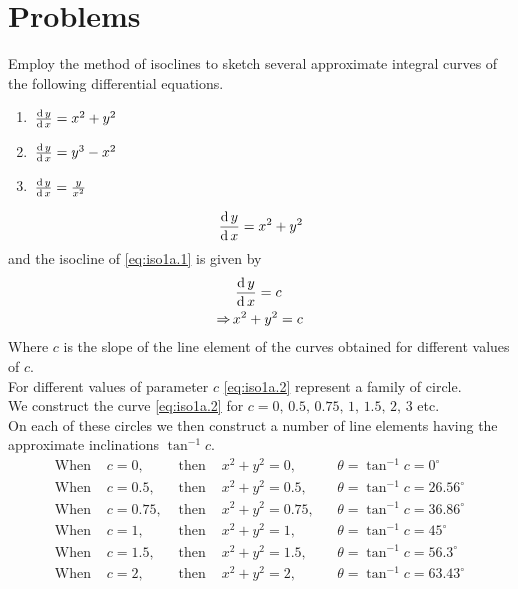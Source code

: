 \documentclass[../main-sheet.tex]{subfiles}
\begin{document}
\section{Problems}
\begin{prob}
    Employ the method of isoclines to sketch several approximate integral curves of the following differential equations.
    \begin{enumerate}[label=(\alph*)]
        \item \(\,\frac{\mathrm{d}\,y}{\mathrm{d}\,x}=x^2+y^2\)
        \item \(\,\frac{\mathrm{d}\,y}{\mathrm{d}\,x}=y^3-x^2\)
        \item \(\,\frac{\mathrm{d}\,y}{\mathrm{d}\,x}=\frac{y}{x^2}\)
    \end{enumerate}
\end{prob}
\begin{soln}[a]
    \begin{equation}
        \,\frac{\mathrm{d}\,y}{\mathrm{d}\,x}=x^2+y^2\label{eq:iso1a.1}
    \end{equation}
    and the isocline of \eqref{eq:iso1a.1} is given by 
    \begin{align}
        &\,\frac{\mathrm{d}\,y}{\mathrm{d}\,x}=c\notag\\
        \Rightarrow\,&x^2+y^2=c\label{eq:iso1a.2}
    \end{align}
    Where \(c\) is the slope of the line element of the curves obtained for different values of \(c\).\\
    For different values of parameter \(c\) \eqref{eq:iso1a.2} represent a family of circle.\\
    We construct the curve \eqref{eq:iso1a.2} for \(c=0,\,0.5,\,0.75,\,1,\,1.5,\,2,\,3\) etc.\\
    On each of these circles we then construct a number of line elements having the approximate inclinations \(\tan^{-1}c\).
    \begin{align*}
        \text{When } & c=0,  & \text{ then } & x^2+y^2=0,   &&\theta=\tan^{-1}c=0^{\circ}\\
        \text{When } & c=0.5,  & \text{ then } & x^2+y^2=0.5, &&\theta=\tan^{-1}c=26.56^{\circ}\\
        \text{When } & c=0.75, & \text{ then } & x^2+y^2=0.75, &&\theta=\tan^{-1}c=36.86^{\circ}\\
        \text{When } & c=1,  & \text{ then } & x^2+y^2=1, &&\theta=\tan^{-1}c=45^{\circ}\\
        \text{When } & c=1.5, & \text{ then } & x^2+y^2=1.5, &&\theta=\tan^{-1}c=56.3^{\circ}\\
        \text{When } & c=2, & \text{ then } & x^2+y^2=2, &&\theta=\tan^{-1}c=63.43^{\circ}\\

\end{align*}
\end{soln}
\end{document}
